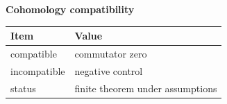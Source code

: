 \begin{center}
\textbf{Cohomology compatibility}\par\smallskip
\begin{tabular}{ll}
\toprule
Item & Value \\
\midrule
compatible & commutator zero \\
incompatible & negative control \\
status & finite theorem under assumptions \\
\bottomrule
\end{tabular}
\end{center}

